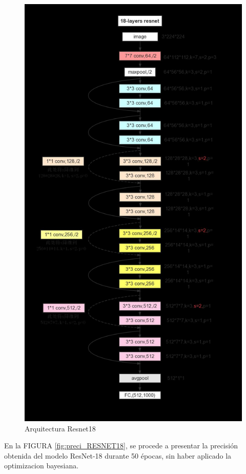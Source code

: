 				\begin{figure}[ht]
					\centering
					\includegraphics[scale=0.07]{Figs/69.png}
					\caption{Arquitectura Resnet18}
					\label{fig:RESNET18}
				\end{figure}

	
		En la FIGURA \ref{fig:preci_RESNET18}, se procede a presentar la precisión obtenida del modelo ResNet-18 durante 50 épocas, sin haber aplicado la optimizacion bayesiana.
		
